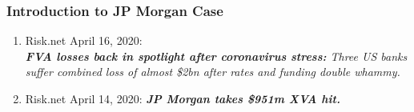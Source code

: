 \documentclass[main.tex]{subfiles}
\begin{document}
    \begin{frame}
        \frametitle{Introduction to JP Morgan Case}

        \begin{enumerate}
            \item Risk.net April 16, 2020: \\
            \textit{%
                \textbf{FVA losses back in spotlight after coronavirus stress:} 
                Three US banks suffer combined loss of almost 
                \$2bn after rates and funding double whammy.
            }
            \item Risk.net April 14, 2020: 
            \textit{\textbf{JP Morgan takes \$951m XVA hit.}}
        \end{enumerate}
    \end{frame}
\end{document}

